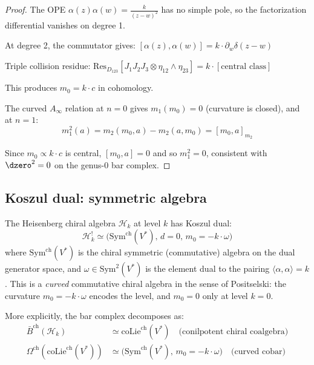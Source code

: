 \begin{proof}
The OPE $\alpha(z)\alpha(w) = \frac{k}{(z-w)^2}$ has no simple pole, so the factorization differential vanishes on degree 1.

At degree 2, the commutator gives:
$[\alpha(z), \alpha(w)] = k \cdot \partial_w\delta(z-w)$

Triple collision residue:
$\text{Res}_{D_{123}}[J_1 J_2 J_3 \otimes \eta_{12} \wedge \eta_{23}] = k \cdot [\text{central class}]$

This produces $m_0 = k \cdot c$ in cohomology.

The curved $A_\infty$ relation at $n = 0$ gives $m_1(m_0) = 0$ (curvature is closed), and at $n = 1$:
\[m_1^2(a) = m_2(m_0, a) - m_2(a, m_0) = [m_0, a]_{m_2}\]

Since $m_0 \propto k \cdot c$ is central, $[m_0, a] = 0$ and so $m_1^2 = 0$, consistent with $\dzero^2 = 0$ on the genus-$0$ bar complex.
\end{proof}


\subsection{Koszul dual: symmetric algebra}

\begin{theorem}\label{thm:heisenberg-koszul-dual-early}
The Heisenberg chiral algebra $\mathcal{H}_k$ at level $k$ has Koszul dual:
\[\mathcal{H}_k^! \simeq \bigl(\mathrm{Sym}^{\mathrm{ch}}(V^*),\, d = 0,\, m_0 = -k \cdot \omega\bigr)\]
where $\mathrm{Sym}^{\mathrm{ch}}(V^*)$ is the chiral symmetric (commutative) algebra on the dual generator space, and $\omega \in \mathrm{Sym}^2(V^*)$ is the element dual to the pairing $\langle \alpha, \alpha \rangle = k$. This is a \emph{curved} commutative chiral algebra in the sense of Positselski: the curvature $m_0 = -k \cdot \omega$ encodes the level, and $m_0 = 0$ only at level $k = 0$.

More explicitly, the bar complex decomposes as:
\begin{align}
\bar{B}^{\mathrm{ch}}(\mathcal{H}_k) &\simeq \mathrm{coLie}^{\mathrm{ch}}(V^*) \quad \text{(conilpotent chiral coalgebra)} \\
\Omega^{\mathrm{ch}}(\mathrm{coLie}^{\mathrm{ch}}(V^*)) &\simeq \bigl(\mathrm{Sym}^{\mathrm{ch}}(V^*),\, m_0 = -k \cdot \omega\bigr) \quad \text{(curved cobar)}
\end{align}
\end{theorem}

